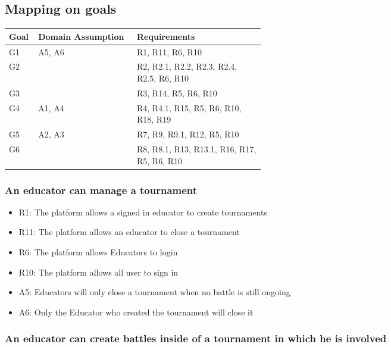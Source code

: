 \subsection{Mapping on goals}

\begin{center}
    \begin{longtable}{|l|l|p{0.50\linewidth}|}
        \hline
            \textbf{Goal} & \textbf{Domain Assumption} & \textbf{Requirements} \\
        \hline
            G1 & A5, A6 & R1, R11, R6, R10\\
        \hline
            G2 & & R2, R2.1, R2.2, R2.3, R2.4, R2.5, R6, R10\\
        \hline
            G3 & & R3, R14, R5, R6, R10 \\
        \hline
            G4 & A1, A4 & R4, R4.1, R15, R5, R6, R10, R18, R19\\
        \hline
            G5 & A2, A3 & R7, R9, R9.1, R12, R5, R10\\
        \hline
            G6 & & R8, R8.1, R13, R13.1, R16, R17, R5, R6, R10\\
        \hline
    \end{longtable}
\end{center}

\subsubsection{An educator can manage a tournament}

\begin{itemize}
    \item R1: The platform allows a signed in educator to create tournaments
    \item R11: The platform allows an educator to close a tournament
    \item R6: The platform allows Educators to login
    \item R10: The platform allows all user to sign in
    \item A5: Educators will only close a tournament when no battle is still ongoing
    \item A6: Only the Educator who created the tournament will close it
\end{itemize}

\subsubsection{An educator can create battles inside of a tournament in which he is involved}

